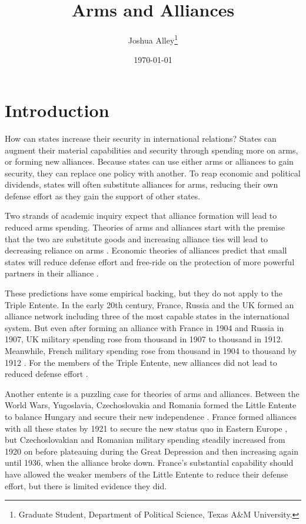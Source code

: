 \documentclass[12pt]{article}
\title{\textbf{Arms and Alliances}}
\author{Joshua Alley\footnote{Graduate Student,
Department of Political Science, Texas A\&M University.}}
\date{{\normalsize \today}}
\begin{document}
\maketitle 

\newpage 

\doublespace 



\section*{Introduction}

How can states increase their security in international relations? States can augment their material capabilities and security through spending more on arms, or forming new alliances. Because states can use either arms or alliances to gain security, they can replace one policy with another. To reap economic and political dividends, states will often substitute alliances for arms, reducing their own defense effort as they gain the support of other states. 

Two strands of academic inquiry expect that alliance formation will lead to reduced arms spending. Theories of arms and alliances start with the premise that the two are substitute goods and increasing alliance ties will lead to decreasing reliance on arms \citep{Morrow1993, Sorokin1994, DigiuseppePoast2016}. Economic theories of alliances predict that small states will reduce defense effort and free-ride on the protection of more powerful partners in their alliance \citep{OlsonZeckhauser1966, SandlerHartley2001}. 

These predictions have some empirical backing, but they do not apply to the Triple Entente. In the early 20th century, France, Russia and the UK formed an alliance network including three of the most capable states in the international system. But even after forming an alliance with France in 1904 and Russia in 1907, UK military spending rose from  thousand in 1907 to  thousand in 1912. Meanwhile, French military spending rose from  thousand  in 1904 to  thousand by 1912 \citep{SingerCINC1988}. For the members of the Triple Entente, new alliances did not lead to reduced defense effort \citep{Schmitt1924}. 

Another entente is a puzzling case for theories of arms and alliances. Between the World Wars, Yugoslavia, Czechoslovakia and Romania formed the Little Entente to balance Hungary and secure their new independence \citep{Benes1922, Osusky1934}. France formed alliances with all these states by 1921 to secure the new status quo in Eastern Europe \citep[pg. 142-3]{Crane1931}, but Czechoslovakian and Romanian military spending steadily increased from 1920 on before plateauing during the Great Depression and then increasing again until 1936, when the alliance broke down. France's substantial capability should have allowed the weaker members of the Little Entente to reduce their defense effort, but there is limited evidence they did. 
\end{document}
